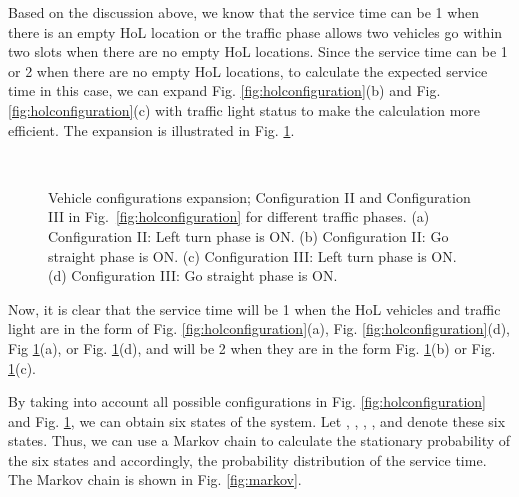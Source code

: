 \documentclass[conference]{IEEEtran}
\begin{document}
Based on the discussion above, we know that the service time can be 1 when there is an empty HoL location or the traffic phase allows two vehicles go within two slots when there are no empty HoL locations. Since the service time can be 1 or 2 when there are no empty HoL locations, to calculate the expected service time in this case, we can expand Fig. \ref{fig:holconfiguration}(b) and Fig. \ref{fig:holconfiguration}(c) with traffic light status to make the calculation more efficient. The expansion is illustrated in Fig. \ref{fig:holconfig_lights}.


\begin{figure}[t!]
\vspace{10pt}
\begin{center}
 \hspace{10pt}
 \\
 \hspace{10pt}
\end{center}
\begin{center}
\vspace{-5pt}
\caption{\label{fig:holconfig_lights} Vehicle configurations expansion; Configuration II and Configuration III in Fig.~\ref{fig:holconfiguration} for different traffic phases. (a) Configuration II: Left turn phase is ON. (b) Configuration II: Go straight phase is ON. (c) Configuration III: Left turn phase is ON. (d) Configuration III: Go straight phase is ON.}
\vspace{-25pt}
\end{center}
\end{figure}

Now, it is clear that the service time will be 1 when the HoL vehicles and traffic light are in the form of Fig. \ref{fig:holconfiguration}(a), Fig. \ref{fig:holconfiguration}(d), Fig \ref{fig:holconfig_lights}(a), or Fig. \ref{fig:holconfig_lights}(d), and will be 2 when they are in the form Fig. \ref{fig:holconfig_lights}(b) or Fig. \ref{fig:holconfig_lights}(c).

By taking into account all possible configurations in Fig. \ref{fig:holconfiguration} and Fig. \ref{fig:holconfig_lights}, we can obtain six states of the system. Let , , , ,  and  denote these six states. Thus, we can use a Markov chain to calculate the stationary probability of the six states and accordingly, the probability distribution of the service time. The Markov chain is shown in Fig. \ref{fig:markov}.
\end{document}

